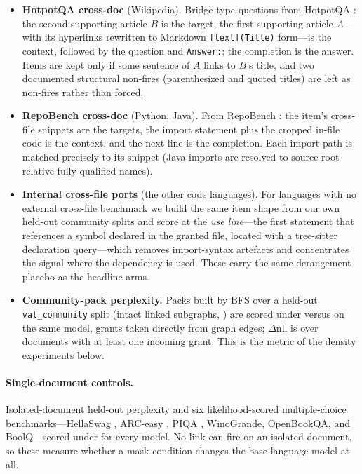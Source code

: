 \begin{itemize}
  \item \textbf{HotpotQA cross-doc} (Wikipedia). Bridge-type questions from HotpotQA
        \citep{yang2018hotpotqa}: the second supporting article $B$ is the target, the
        first supporting article $A$---with its hyperlinks rewritten to Markdown
        \texttt{[text](Title)} form---is the context, followed by the question and
        \texttt{Answer:}; the completion is the answer. Items are kept only if some
        sentence of $A$ links to $B$'s title, and two documented structural non-fires
        (parenthesized and quoted titles) are left as non-fires rather than forced.
  \item \textbf{RepoBench cross-doc} (Python, Java). From RepoBench
        \citep{liu2024repobench}: the item's cross-file snippets are the targets, the
        import statement plus the cropped in-file code is the context, and the next
        line is the completion. Each import path is matched precisely to its snippet
        (Java imports are resolved to source-root-relative fully-qualified names).
  \item \textbf{Internal cross-file ports} (the other code languages). For languages
        with no external cross-file benchmark we build the same item shape from our own
        held-out community splits and score at the \emph{use line}---the first statement
        that references a symbol declared in the granted file, located with a
        tree-sitter declaration query---which removes import-syntax artefacts and
        concentrates the signal where the dependency is used. These carry the same
        derangement placebo as the headline arms.
  \item \textbf{Community-pack perplexity.} Packs built by BFS over a held-out
        \texttt{val\_community} split (intact linked subgraphs, ) are
        scored under \crossdoc versus \doccausal on the same model, grants taken
        directly from graph edges; $\Delta\mathrm{nll}$ is over documents with at least
        one incoming grant. This is the metric of the density experiments below.
\end{itemize}

\paragraph{Single-document controls.}
Isolated-document held-out perplexity and six likelihood-scored multiple-choice
benchmarks---HellaSwag \citep{zellers2019hellaswag}, ARC-easy \citep{clark2018arc},
PIQA \citep{bisk2020piqa}, WinoGrande, OpenBookQA, and BoolQ---scored under
\doccausal for every model. No link can fire on an isolated document, so these
measure whether a mask condition changes the base language model at all.

